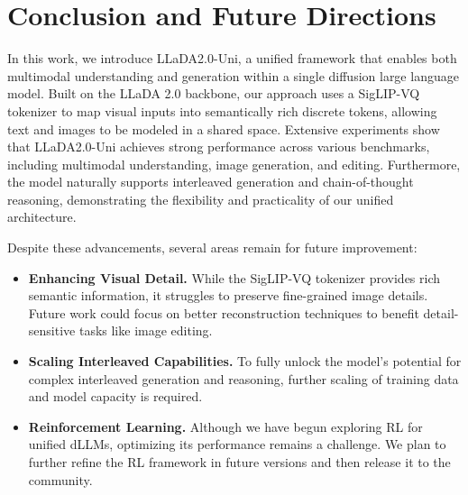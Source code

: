 \section{Conclusion and Future Directions}
In this work, we introduce LLaDA2.0-Uni, a unified framework that enables both multimodal understanding and generation within a single diffusion large language model.
%
Built on the LLaDA 2.0 backbone, our approach uses a SigLIP-VQ tokenizer to map visual inputs into semantically rich discrete tokens, allowing text and images to be modeled in a shared space.
%
Extensive experiments show that LLaDA2.0-Uni achieves strong performance across various benchmarks, including multimodal understanding, image generation, and editing.
%
Furthermore, the model naturally supports interleaved generation and chain-of-thought reasoning, demonstrating the flexibility and practicality of our unified architecture.

Despite these advancements, several areas remain for future improvement: 
\begin{itemize}[leftmargin=16pt]
    \item \textbf{Enhancing Visual Detail.} While the SigLIP-VQ tokenizer provides rich semantic information, it struggles to preserve fine-grained image details. Future work could focus on better reconstruction techniques to benefit detail-sensitive tasks like image editing.

    \item \textbf{Scaling Interleaved Capabilities.} To fully unlock the model’s potential for complex interleaved generation and reasoning, further scaling of training data and model capacity is required.

    \item \textbf{Reinforcement Learning.} Although we have begun exploring RL for unified dLLMs, optimizing its performance remains a challenge. We plan to further refine the RL framework in future versions and then release it to the community.   
\end{itemize}